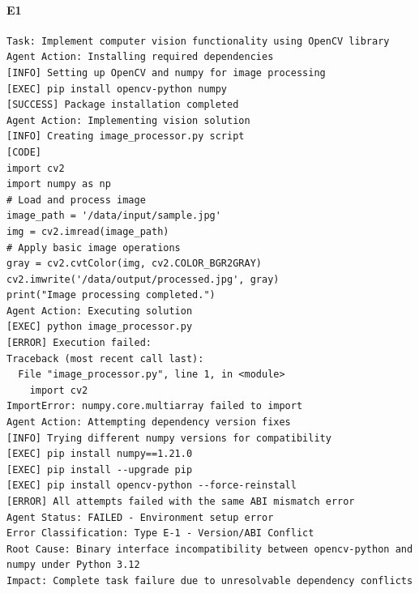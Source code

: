 \paragraph{E1}
\begin{lstlisting}[language={},caption={OpenCV import failed due to numpy ABI compatibility issues.},label={lst:opencv-numpy-abi}]
Task: Implement computer vision functionality using OpenCV library
Agent Action: Installing required dependencies
[INFO] Setting up OpenCV and numpy for image processing
[EXEC] pip install opencv-python numpy
[SUCCESS] Package installation completed
Agent Action: Implementing vision solution
[INFO] Creating image_processor.py script
[CODE] 
import cv2
import numpy as np
# Load and process image
image_path = '/data/input/sample.jpg'
img = cv2.imread(image_path)
# Apply basic image operations
gray = cv2.cvtColor(img, cv2.COLOR_BGR2GRAY)
cv2.imwrite('/data/output/processed.jpg', gray)
print("Image processing completed.")
Agent Action: Executing solution
[EXEC] python image_processor.py
[ERROR] Execution failed:
Traceback (most recent call last):
  File "image_processor.py", line 1, in <module>
    import cv2
ImportError: numpy.core.multiarray failed to import
Agent Action: Attempting dependency version fixes
[INFO] Trying different numpy versions for compatibility
[EXEC] pip install numpy==1.21.0
[EXEC] pip install --upgrade pip
[EXEC] pip install opencv-python --force-reinstall
[ERROR] All attempts failed with the same ABI mismatch error
Agent Status: FAILED - Environment setup error
Error Classification: Type E-1 - Version/ABI Conflict
Root Cause: Binary interface incompatibility between opencv-python and numpy under Python 3.12
Impact: Complete task failure due to unresolvable dependency conflicts
\end{lstlisting}

